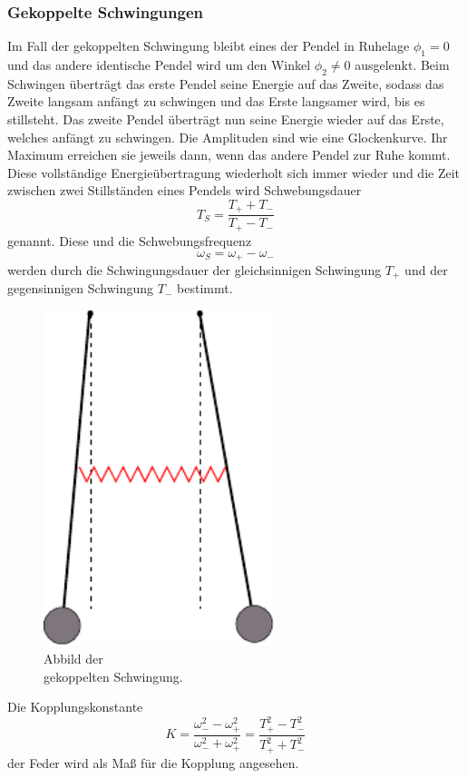 \subsubsection{Gekoppelte Schwingungen}
\label{subsec:Gekoppelt}
\begin{minipage}[t]{0.5\textwidth}
Im Fall der gekoppelten Schwingung bleibt eines der Pendel in Ruhelage $\phi_1=0$ und das andere identische Pendel wird um den Winkel $\phi_2 \neq 0$ ausgelenkt.
Beim Schwingen überträgt das erste Pendel seine Energie auf das Zweite, sodass das Zweite langsam anfängt zu schwingen und das Erste langsamer wird, bis es stillsteht.
Das zweite Pendel überträgt nun seine Energie wieder auf das Erste, welches anfängt zu schwingen.
Die Amplituden sind wie eine Glockenkurve. 
Ihr Maximum erreichen sie jeweils dann, wenn das andere Pendel zur Ruhe kommt.
Diese vollständige Energieübertragung wiederholt sich immer wieder und die Zeit zwischen zwei Stillständen eines Pendels wird Schwebungsdauer 
\begin{equation}
    T_S=\frac{T_+ + T_-}{T_+-T_-}
    \label{eqn:TS}
\end{equation}
genannt. Diese und die Schwebungsfrequenz
\begin{equation}
    \omega_S = \omega_+ - \omega_-
    \label{eqn:omegaS}
\end{equation}
werden durch die Schwingungsdauer der gleichsinnigen Schwingung $T_+$ und der gegensinnigen Schwingung $T_-$ bestimmt.

\end{minipage}
\begin{minipage}[t]{0.5\textwidth}
    \begin{figure}[H]
        \centering
        \includegraphics[width=0.6\textwidth]{Abbildungen/Abb_3.pdf}
        \caption{Abbild der \\gekoppelten Schwingung. \cite{V106}}
        \label{fig:gekoppelt}
      \end{figure}
\end{minipage}

Die Kopplungskonstante
\begin{equation}
    K = \frac{\omega_-^2 -\omega_+^2}{\omega_-^2 + \omega_+^2} = \frac{T_+^2 - T_-^2}{T_+^2 + T_-^2}
    \label{eqn:K}
\end{equation}
der Feder wird als Maß für die Kopplung angesehen.
